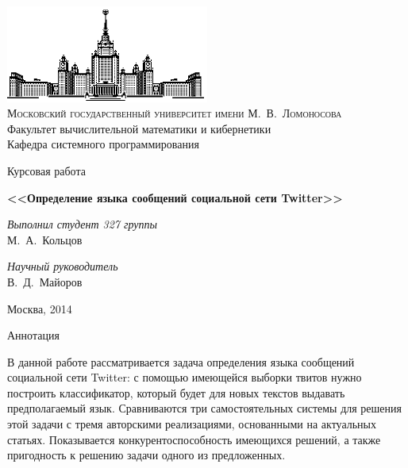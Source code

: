 \documentclass[a4paper, 14pt]{article}
\begin{document}
\linespread{1.3} %
\frenchspacing
\thispagestyle{empty}


\begin{center}
\ \vspace{-3cm}

\includegraphics[width=0.5\textwidth]{msu.eps}\\

{\scshape Московский государственный университет имени М.~В.~Ломоносова}\\
Факультет вычислительной математики и кибернетики\\
Кафедра системного программирования

\vfill

{\LARGE Курсовая работа}

\vspace{1cm}

{\Huge\bfseries <<Определение языка сообщений социальной сети Twitter>>} \\

\end{center}

\vspace{1cm}

\begin{flushright}
  \large
  \textit{Выполнил студент 327 группы}\\
  М.~А.~Кольцов

  \vspace{5mm}

  \textit{Научный руководитель}\\
  В.~Д.~Майоров
\end{flushright}

\vfill

\begin{center}
Москва, 2014
\end{center}

\pagebreak
\tableofcontents
\pagebreak

\begin{center}Аннотация\end{center}

\hangindent=3.5cm  \noindent В данной работе рассматривается задача определения языка сообщений социальной сети Twitter: с помощью имеющейся выборки твитов нужно построить классификатор, который будет для новых текстов выдавать предполагаемый язык. Сравниваются три самостоятельных системы для решения этой задачи с тремя авторскими реализациями, основанными на актуальных статьях. Показывается конкурентоспособность имеющихся решений, а также пригодность к решению задачи одного из предложенных.
\end{document}
